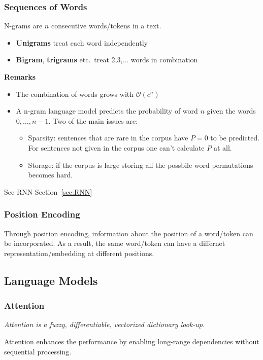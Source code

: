 \subsubsection{Sequences of Words}
N-grams are $n$ consecutive words/tokens in a text.
\begin{itemize}
    \item \textbf{Unigrams} treat each word independently
    \item \textbf{Bigram}, \textbf{trigrams} etc.\ treat 2,3,$\ldots$ words in combination
\end{itemize}
\textbf{Remarks}
\begin{itemize}
    \item The combination of words grows with $\mathcal{O}(c^n)$
    \item A n-gram language model predicts the probability of word $n$ given the words $0,\dots,n-1$. Two of the main issues are:
    \begin{itemize}
        \item Sparsity: sentences that are rare in the corpus have $P=0$ to be predicted. For sentences not given in the corpus one can't calculate $P$ at all.
        \item Storage: if the corpus is large storing all the possbile word permutations becomes hard.
    \end{itemize}
\end{itemize}

\newpar{}
See RNN Section~\ref{sec:RNN}

\subsubsection{Position Encoding}
Through position encoding, information about the position of a word/token can be incorporated. As a result, the same word/token can have a differnet representation/embedding at different positions.

\subsection{Language Models}
\subsubsection{Attention}
\textit{Attention is a fuzzy, differentiable, vectorized dictionary look-up.}

\newpar{}
Attention enhances the performance by enabling long-range dependencies without sequential processing.

